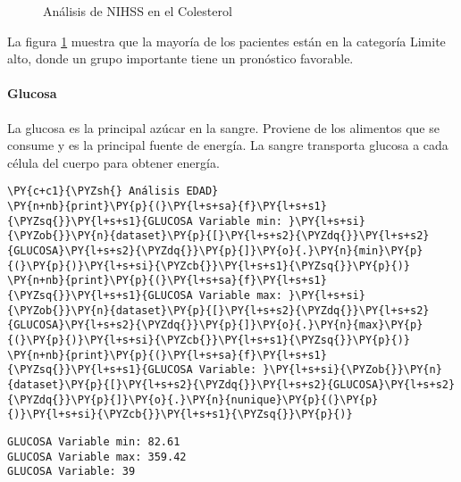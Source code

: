 \begin{center}
    	\begin{figure}[H]
	\centering
	\caption{Análisis de NIHSS en el Colesterol}
	\label{fig:aNISSc}
	\end{figure}
\end{center}
    
    La figura \ref{fig:aNISSc} muestra que la mayoría de los pacientes están en la categoría Limite alto, donde un grupo importante tiene un pronóstico favorable.

    \hypertarget{glucosa}{%
\paragraph{Glucosa}\label{glucosa}}

La glucosa es la principal azúcar en la sangre. Proviene de los alimentos que se consume y es la principal fuente de energía. La sangre transporta glucosa a cada célula del cuerpo para obtener energía.

    \begin{tcolorbox}[breakable, size=fbox, boxrule=1pt, pad at break*=1mm,colback=cellbackground, colframe=cellborder]
\begin{Verbatim}[commandchars=\\\{\}]
\PY{c+c1}{\PYZsh{} Análisis EDAD}
\PY{n+nb}{print}\PY{p}{(}\PY{l+s+sa}{f}\PY{l+s+s1}{\PYZsq{}}\PY{l+s+s1}{GLUCOSA Variable min: }\PY{l+s+si}{\PYZob{}}\PY{n}{dataset}\PY{p}{[}\PY{l+s+s2}{\PYZdq{}}\PY{l+s+s2}{GLUCOSA}\PY{l+s+s2}{\PYZdq{}}\PY{p}{]}\PY{o}{.}\PY{n}{min}\PY{p}{(}\PY{p}{)}\PY{l+s+si}{\PYZcb{}}\PY{l+s+s1}{\PYZsq{}}\PY{p}{)}
\PY{n+nb}{print}\PY{p}{(}\PY{l+s+sa}{f}\PY{l+s+s1}{\PYZsq{}}\PY{l+s+s1}{GLUCOSA Variable max: }\PY{l+s+si}{\PYZob{}}\PY{n}{dataset}\PY{p}{[}\PY{l+s+s2}{\PYZdq{}}\PY{l+s+s2}{GLUCOSA}\PY{l+s+s2}{\PYZdq{}}\PY{p}{]}\PY{o}{.}\PY{n}{max}\PY{p}{(}\PY{p}{)}\PY{l+s+si}{\PYZcb{}}\PY{l+s+s1}{\PYZsq{}}\PY{p}{)}
\PY{n+nb}{print}\PY{p}{(}\PY{l+s+sa}{f}\PY{l+s+s1}{\PYZsq{}}\PY{l+s+s1}{GLUCOSA Variable: }\PY{l+s+si}{\PYZob{}}\PY{n}{dataset}\PY{p}{[}\PY{l+s+s2}{\PYZdq{}}\PY{l+s+s2}{GLUCOSA}\PY{l+s+s2}{\PYZdq{}}\PY{p}{]}\PY{o}{.}\PY{n}{nunique}\PY{p}{(}\PY{p}{)}\PY{l+s+si}{\PYZcb{}}\PY{l+s+s1}{\PYZsq{}}\PY{p}{)}
\end{Verbatim}
\end{tcolorbox}

    \begin{Verbatim}[commandchars=\\\{\}]
GLUCOSA Variable min: 82.61
GLUCOSA Variable max: 359.42
GLUCOSA Variable: 39
    \end{Verbatim}

